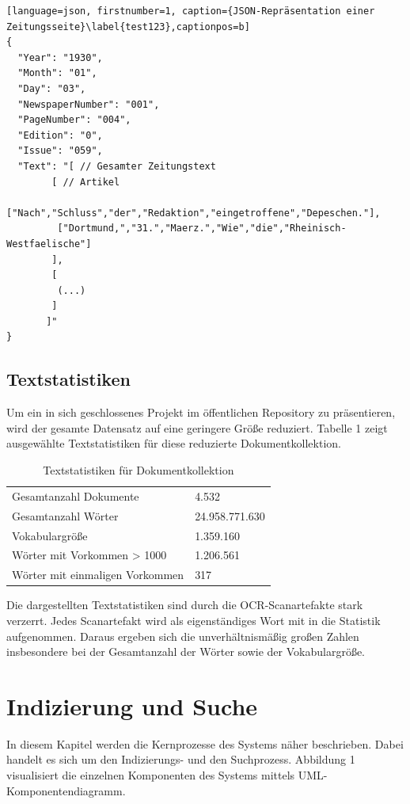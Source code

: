 \documentclass[11pt,a4paper, halfparskip]{scrartcl}
\begin{document}
\break

\begin{lstlisting}[language=json, firstnumber=1, caption={JSON-Repräsentation einer Zeitungsseite}\label{test123},captionpos=b]
{
  "Year": "1930",
  "Month": "01",
  "Day": "03",
  "NewspaperNumber": "001",
  "PageNumber": "004",
  "Edition": "0",
  "Issue": "059",
  "Text": "[ // Gesamter Zeitungstext
	    [ // Artikel
	     ["Nach","Schluss","der","Redaktion","eingetroffene","Depeschen."], 
	     ["Dortmund,","31.","Maerz.","Wie","die","Rheinisch-Westfaelische"] 
	    ],
	    [
	     (...)
	    ] 
	   ]"
}
\end{lstlisting}

\subsection{Textstatistiken}
Um ein in sich geschlossenes Projekt im öffentlichen Repository zu präsentieren, wird der gesamte Datensatz auf eine geringere Größe reduziert.
Tabelle 1 zeigt ausgewählte Textstatistiken für diese reduzierte Dokumentkollektion.

\begin{table}[h!]
	\centering
	\begin{tabularx}{0.8\textwidth}{lX}
		\hline
		Gesamtanzahl Dokumente & 4.532\\
		Gesamtanzahl Wörter & 24.958.771.630 \\
		Vokabulargröße & 1.359.160 \\
		Wörter mit Vorkommen > 1000 & 1.206.561 \\
		Wörter mit einmaligen Vorkommen & 317 \\
		\hline
	\end{tabularx}
	\caption{Textstatistiken für Dokumentkollektion}
\end{table}

Die dargestellten Textstatistiken sind durch die OCR-Scanartefakte stark verzerrt.
Jedes Scanartefakt wird als eigenständiges Wort mit in die Statistik aufgenommen. 
Daraus ergeben sich die unverhältnismäßig großen Zahlen insbesondere bei der Gesamtanzahl der Wörter sowie der Vokabulargröße.

\section{Indizierung und Suche}

In diesem Kapitel werden die Kernprozesse des Systems näher beschrieben. 
Dabei handelt es sich um den Indizierungs- und den Suchprozess.
Abbildung 1 visualisiert die einzelnen Komponenten des Systems mittels UML-Komponentendiagramm. 
\end{document}
